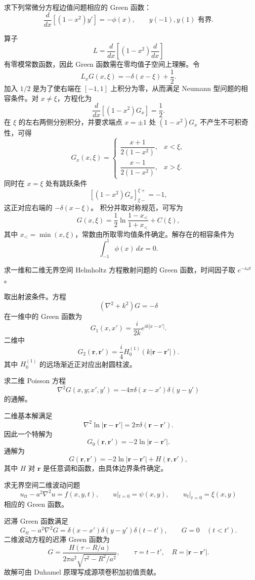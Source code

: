 \begin{question}
求下列常微分方程边值问题相应的 Green 函数：
\[
\frac d{dx}\left[(1-x^2)y'\right]=-\phi(x),\qquad
y(-1),y(1)\text{ 有界}.
\]
\begin{solution}
算子
\[
L=\frac d{dx}\left[(1-x^2)\frac d{dx}\right]
\]
有零模常数函数，因此 Green 函数需在零均值子空间上理解。令
\[
L_xG(x,\xi)=-\delta(x-\xi)+\frac12.
\]
加入 \(1/2\) 是为了使右端在 \([-1,1]\) 上积分为零，从而满足 Neumann 型问题的相容条件。对 \(x\ne\xi\)，方程化为
\[
\frac d{dx}\left[(1-x^2)G_x\right]=\frac12.
\]
在 \(\xi\) 的左右两侧分别积分，并要求端点 \(x=\pm1\) 处 \((1-x^2)G_x\) 不产生不可积奇性，可得
\[
G_x(x,\xi)=
\begin{cases}
\dfrac{x+1}{2(1-x^2)},&x<\xi,\\
\dfrac{x-1}{2(1-x^2)},&x>\xi.
\end{cases}
\]
同时在 \(x=\xi\) 处有跳跃条件
\[
\left[(1-x^2)G_x\right]_{\xi-}^{\xi+}=-1,
\]
这正对应右端的 \(-\delta(x-\xi)\)。
积分并取对称规范，可写为
\[
G(x,\xi)=\frac12\ln\frac{1-x_<}{1+x_<}
+C(\xi),
\]
其中 \(x_<=\min(x,\xi)\)，常数由所取零均值条件确定。解存在的相容条件为
\[
\int_{-1}^{1}\phi(x)\,dx=0.
\]
\end{solution}
\end{question}

\begin{question}
求一维和二维无界空间 Helmholtz 方程散射问题的 Green 函数，时间因子取 \(e^{-i\omega t}\)。
\begin{solution}
取出射波条件。方程
\[
(\nabla^2+k^2)G=-\delta
\]
在一维中的 Green 函数为
\[
G_1(x,x')=\frac{i}{2k}e^{ik|x-x'|}.
\]
二维中
\[
G_2(\bm r,\bm r')=\frac{i}{4}H_0^{(1)}(k|\bm r-\bm r'|).
\]
其中 \(H_0^{(1)}\) 的远场渐近正对应出射圆柱波。
\end{solution}
\end{question}

\begin{question}
求二维 Poisson 方程
\[
\nabla^2G(x,y;x',y')=-4\pi\delta(x-x')\delta(y-y')
\]
的通解。
\begin{solution}
二维基本解满足
\[
\nabla^2\ln|\bm r-\bm r'|=2\pi\delta(\bm r-\bm r').
\]
因此一个特解为
\[
G_0(\bm r,\bm r')=-2\ln|\bm r-\bm r'|.
\]
通解为
\[
G(\bm r,\bm r')=-2\ln|\bm r-\bm r'|+H(\bm r,\bm r'),
\]
其中 \(H\) 对 \(\bm r\) 是任意调和函数，由具体边界条件确定。
\end{solution}
\end{question}

\begin{question}
求无界空间二维波动问题
\[
u_{tt}-a^2\nabla^2u=f(x,y,t),\qquad
u|_{t=0}=\psi(x,y),\qquad u_t|_{t=0}=\xi(x,y)
\]
相应的 Green 函数。
\begin{solution}
迟滞 Green 函数满足
\[
G_{tt}-a^2\nabla^2G=\delta(x-x')\delta(y-y')\delta(t-t'),\qquad G=0\quad(t<t').
\]
二维波动方程的迟滞 Green 函数为
\[
G=\frac{H(\tau-R/a)}{2\pi a^2\sqrt{\tau^2-R^2/a^2}},
\qquad
\tau=t-t',\quad R=|\bm r-\bm r'|.
\]
故解可由 Duhamel 原理写成源项卷积加初值贡献。
\end{solution}
\end{question}

